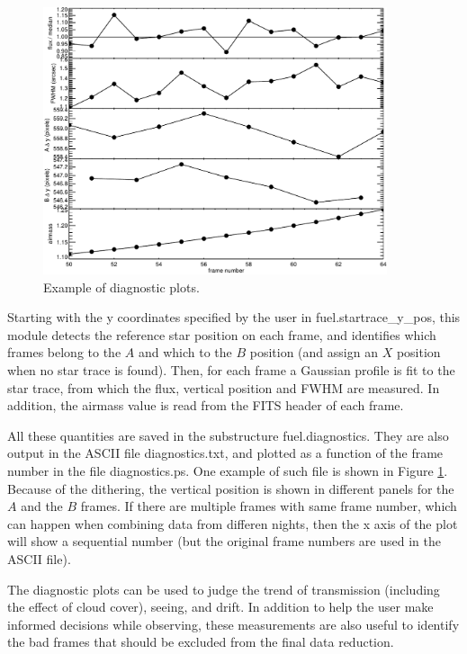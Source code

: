 \documentclass[a4paper, notitlepage]{article}
\begin{document}
\begin{figure}[htbp]
\centering
\includegraphics[width=0.9\textwidth]{diagnostics}
\caption{Example of diagnostic plots.}
\label{fig:diagnostics}
\end{figure}

Starting with the y coordinates specified by the user in fuel.startrace\_y\_pos, this module detects the reference star position on each frame, and identifies which frames belong to the $A$ and which to the $B$ position (and assign an $X$ position when no star trace is found). Then, for each frame a Gaussian profile is fit to the star trace, from which the flux, vertical position and FWHM are measured. In addition, the airmass value is read from the FITS header of each frame.

All these quantities are saved in the substructure fuel.diagnostics. They are also output in the ASCII file diagnostics.txt, and plotted as a function of the frame number in the file diagnostics.ps. One example of such file is shown in Figure \ref{fig:diagnostics}. Because of the dithering, the vertical position is shown in different panels for the $A$ and the $B$ frames. If there are multiple frames with same frame number, which can happen when combining data from differen nights, then the x axis of the plot will show a sequential number (but the original frame numbers are used in the ASCII file).

The diagnostic plots can be used to judge the trend of transmission (including the effect of cloud cover), seeing, and drift. In addition to help the user make informed decisions while observing, these measurements are also useful to identify the bad frames that should be excluded from the final data reduction.
\end{document}
